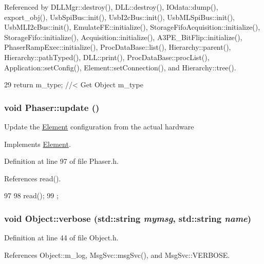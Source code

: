 Referenced by DLLMgr::destroy(), DLL::destroy(), IOdata::dump(), export\_\-obj(), UsbSpiBus::init(), UsbI2cBus::init(), UsbMLSpiBus::init(), UsbMLI2cBus::init(), EmulateFE::initialize(), StorageFifoAcquisition::initialize(), StorageFifo::initialize(), Acquisition::initialize(), A3PE\_\-BitFlip::initialize(), PhaserRampExec::initialize(), ProcDataBase::list(), Hierarchy::parent(), Hierarchy::pathTyped(), DLL::print(), ProcDataBase::procList(), Application::setConfig(), Element::setConnection(), and Hierarchy::tree().


\begin{DoxyCode}
29 { return m_type;       } //< Get Object m_type
\end{DoxyCode}
\hypertarget{classPhaser_ae1d1d3be2eed3973d269eab78834c594}{
\subsubsection[{update}]{\setlength{\rightskip}{0pt plus 5cm}void Phaser::update ()}}
\label{classPhaser_ae1d1d3be2eed3973d269eab78834c594}
Update the \hyperlink{classElement}{Element} configuration from the actual hardware 

Implements \hyperlink{classElement_a4e6c83efae95616ebddd03c793a26661}{Element}.

Definition at line 97 of file Phaser.h.

References read().


\begin{DoxyCode}
97                  {
98     read();
99   };
\end{DoxyCode}
\hypertarget{classObject_a2d4120195317e2a3c6532e8bb9f3da68}{
\subsubsection[{verbose}]{\setlength{\rightskip}{0pt plus 5cm}void Object::verbose (std::string {\em mymsg}, \/  std::string {\em name})}}
\label{classObject_a2d4120195317e2a3c6532e8bb9f3da68}


Definition at line 44 of file Object.h.

References Object::m\_\-log, MsgSvc::msgSvc(), and MsgSvc::VERBOSE.


